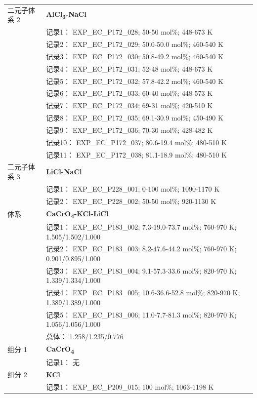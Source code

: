 \documentclass[12pt]{article}
\begin{document}
{\begin{longtable}[]{@{}
  >{\raggedright\arraybackslash}p{}
  >{\raggedright\arraybackslash}p{}@{}}
二元子体系 2  & \textbf{AlCl\textsubscript{3}-NaCl} \\
 & 记录1： EXP\_EC\_P172\_028; 50-50 mol\%; 448-673 K \\
 & 记录2： EXP\_EC\_P172\_029; 50.0-50.0 mol\%; 460-540 K \\
 & 记录3： EXP\_EC\_P172\_030; 50.8-49.2 mol\%; 460-540 K \\
 & 记录4： EXP\_EC\_P172\_031; 52-48 mol\%; 448-673 K \\
 & 记录5： EXP\_EC\_P172\_032; 57.8-42.2 mol\%; 460-540 K \\
 & 记录6： EXP\_EC\_P172\_033; 60-40 mol\%; 448-573 K \\
 & 记录7： EXP\_EC\_P172\_034; 69-31 mol\%; 420-510 K \\
 & 记录8： EXP\_EC\_P172\_035; 69.1-30.9 mol\%; 450-490 K \\
 & 记录9： EXP\_EC\_P172\_036; 70-30 mol\%; 428-482 K \\
 & 记录10： EXP\_EC\_P172\_037; 80.6-19.4 mol\%; 480-510 K \\
 & 记录11： EXP\_EC\_P172\_038; 81.1-18.9 mol\%; 480-510 K  \\

二元子体系 3  & \textbf{LiCl-NaCl} \\
 & 记录1： EXP\_EC\_P228\_001; 0-100 mol\%; 1090-1170 K \\
 & 记录2： EXP\_EC\_P228\_002; 50-50 mol\%; 920-1130 K  \\

\midrule
体系 & \textbf{CaCrO\textsubscript{4}-KCl-LiCl} \\
 & 记录1： EXP\_EC\_P183\_002; 7.3-19.0-73.7 mol\%; 760-970 K; 1.505/1.502/1.000 \\
 & 记录2： EXP\_EC\_P183\_003; 8.2-47.6-44.2 mol\%; 760-970 K; 0.901/0.895/1.000 \\
 & 记录3： EXP\_EC\_P183\_004; 9.1-57.3-33.6 mol\%; 820-970 K; 1.339/1.334/1.000 \\
 & 记录4： EXP\_EC\_P183\_005; 10.6-36.6-52.8 mol\%; 820-970 K; 1.389/1.389/1.000 \\
 & 记录5： EXP\_EC\_P183\_006; 11.0-7.7-81.3 mol\%; 820-970 K; 1.056/1.056/1.000 \\
 & 总体： 1.258/1.235/0.776  \\

组分 1 & \textbf{CaCrO\textsubscript{4}} \\
 & 记录1： 无 \\
组分 2  & \textbf{KCl} \\
 & 记录1： EXP\_EC\_P209\_015; 100 mol\%; 1063-1198 K  \\


\end{longtable}}
\end{document}
